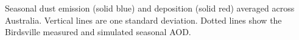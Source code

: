 \label{fig:seasonaldust}
Seasonal dust emission (solid blue) and deposition (solid red) averaged across Australia.
Vertical lines are one standard deviation.
Dotted lines show the Birdsville measured and simulated seasonal AOD.
